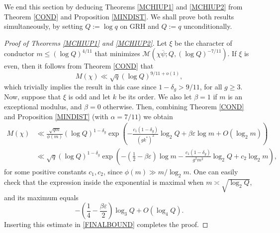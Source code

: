 \documentclass[12pt]{amsart}
\theoremstyle{definition}
\numberwithin{equation}{section}
\newcommand{\mc}{\mathcal}
\newcommand{\e}{\varepsilon}
\renewcommand{\bar}{\overline}
\begin{document}
We end this section by deducing Theorems \ref{MCHIUP1} and \ref{MCHIUP2} from Theorem \ref{COND} and Proposition \ref{MINDIST}. We shall prove both results simultaneously, by setting $Q:=\log q$ on GRH and $Q:=q$ unconditionally. 
\begin{proof}[Proof of Theorems \ref{MCHIUP1} and \ref{MCHIUP2}]
Let  $\xi$ be the character of conductor $m \leq (\log Q)^{4/11}$ that minimizes $\mc{M}\left(\chi\bar{\psi}; Q,(\log Q)^{-7/11}\right)$. If $\xi$ is even, then it follows from Theorem \ref{COND} that
$$ M(\chi)\ll \sqrt{q} (\log Q)^{9/11+o(1)},$$
which trivially implies the result in this case since $1-\delta_g>9/11$, for all $g\geq 3$.
Now, suppose that $\xi$ is odd and let $k$ be its order. We also let $\beta=1$ if $m$ is an exceptional modulus, and $\beta=0$ otherwise. Then, combining Theorem \ref{COND} and Proposition \ref{MINDIST} (with $\alpha=7/11$) we obtain
\begin{equation}\label{FINALBOUND}
\begin{aligned}
M(\chi) &\ll \frac{\sqrt{qm}}{\phi(m)} (\log Q)^{1-\delta_g} \exp\left(-\frac{c_1(1-\delta_g)}{(gk^{\ast})^2}\log_2 Q+ \beta \e \log m+  O\left(\log_2 m\right)\right) \\
&\ll \sqrt{q}(\log Q)^{1-\delta_g} \exp\left(-\left(\frac{1}{2}-\beta \e\right) \log m- \frac{c_1(1-\delta_g)}{g^2m^2}\log_2 Q+ c_2 \log_2 m\right),
\end{aligned}
\end{equation}
for some  positive constants $c_1, c_2$, since $\phi(m)\gg m/\log_2 m$.  One can easily check that the expression inside the exponential is maximal when $m \asymp \sqrt{\log_2 Q}$, and its maximum equals 
$$ -\left(\frac{1}{4}-\frac{\beta \e}{2}\right) \log_3 Q+ O\left(\log_4 Q\right).$$
Inserting this estimate in \eqref{FINALBOUND} completes the proof.
\end{proof}
\end{document}
